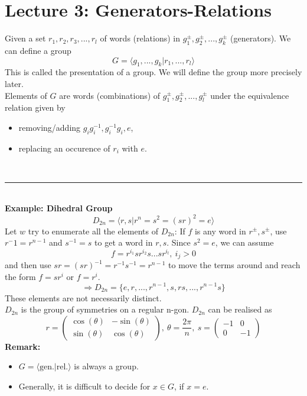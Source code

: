 \documentclass{article}
\begin{document}
\section{Lecture 3: Generators-Relations}
Given a set $r_1,r_2,r_3,...,r_l$ of words (relations) in $g_1^{\pm},g_2^{\pm},...,g_k^{\pm}$ (generators). We can define a group 
\begin{equation}
G=\langle g_1,...,g_k|r_1,...,r_l\rangle
\end{equation}
This is called the presentation of a group. We will define the group more precisely later.\\
\indent Elements of $G$ are words (combinations) of $g_1^{\pm},g_2^{\pm},...,g_l^{\pm}$ under the equivalence relation given by 
\begin{itemize}
\item removing/adding $g_ig_i^{-1}, g_i^{-1}g_i,e$,
\item replacing an occurence of $r_i$ with $e$.
\end{itemize}
\vspace{2mm}~\\
\hrule
\vspace{2mm}~\\
\textbf{Example: Dihedral Group}
\begin{equation}
D_{2n}=\langle r,s|r^n=s^2=(sr)^2=e\rangle
\end{equation}
Let $w$ try to enumerate all the elements of $D_{2n}$:
If $f$ is any word in $r^{\pm},s^{\pm}$, use $r^-1=r^{n-1}$ and $s^{-1}=s$ to get a word in $r,s$. Since $s^2=e$, we can assume
\begin{equation}
f=r^{i_1}sr^{i_2}s...sr^{i_l},~i_j>0
\end{equation}
and then use $sr=(sr)^{-1}=r^{-1}s^{-1}=r^{n-1}$ to move the terms around and reach the form $f=sr^i$ or $f=r^i$.\\
\begin{equation}
\Rightarrow D_{2n}=\lbrace e,r,...,r^{n-1},s,rs,...,r^{n-1}s\rbrace
\end{equation}
These elements are not necessarily distinct.\\
\indent $D_{2n}$ is the group of symmetries on a regular n-gon. $D_{2n}$ can be realised as 
\begin{equation}
r=
\begin{pmatrix}
\cos(\theta)&-\sin(\theta)\\
\sin(\theta)&\cos(\theta)
\end{pmatrix}
,~\theta = \frac{2\pi}{n},~s=
\begin{pmatrix}
-1&0\\
0&-1
\end{pmatrix}
\end{equation}
\textbf{Remark:}
\begin{itemize}
\item $G=\langle \text{gen.}|\text{rel.}\rangle$ is always a group.
\item Generally, it is difficult to decide for $x\in G$, if $x=e$.
\end{itemize}
\newpage
\end{document}
